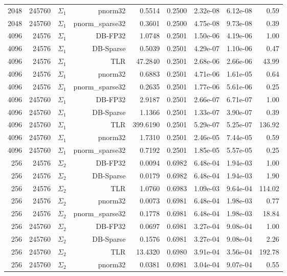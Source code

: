 \begin{tabular}{|r|r|r|r|r|r|r|r|r|}
  2048 & 245760 & $\Sigma_1$ & pnorm32 & 0.5514 & 0.2500 & 2.32e-08 & 6.12e-08 & 0.59 \\
  2048 & 245760 & $\Sigma_1$ & pnorm\_sparse32 & 0.3601 & 0.2500 & 4.75e-08 & 9.73e-08 & 0.39 \\
  4096 & 24576 & $\Sigma_1$ & DB-FP32 & 1.0748 & 0.2501 & 1.50e-06 & 4.19e-06 & 1.00 \\
  4096 & 24576 & $\Sigma_1$ & DB-Sparse & 0.5039 & 0.2501 & 4.29e-07 & 1.10e-06 & 0.47 \\
  4096 & 24576 & $\Sigma_1$ & TLR & 47.2840 & 0.2501 & 2.68e-06 & 2.66e-06 & 43.99 \\
  4096 & 24576 & $\Sigma_1$ & pnorm32 & 0.6883 & 0.2501 & 4.71e-06 & 1.61e-05 & 0.64 \\
  4096 & 24576 & $\Sigma_1$ & pnorm\_sparse32 & 0.2635 & 0.2501 & 1.77e-06 & 5.61e-06 & 0.25 \\
  4096 & 245760 & $\Sigma_1$ & DB-FP32 & 2.9187 & 0.2501 & 2.66e-07 & 6.71e-07 & 1.00 \\
  4096 & 245760 & $\Sigma_1$ & DB-Sparse & 1.1366 & 0.2501 & 1.33e-07 & 3.90e-07 & 0.39 \\
  4096 & 245760 & $\Sigma_1$ & TLR & 399.6190 & 0.2501 & 5.29e-07 & 5.25e-07 & 136.92 \\
  4096 & 245760 & $\Sigma_1$ & pnorm32 & 1.7310 & 0.2501 & 2.46e-05 & 7.44e-05 & 0.59 \\
  4096 & 245760 & $\Sigma_1$ & pnorm\_sparse32 & 0.7192 & 0.2501 & 1.85e-05 & 5.57e-05 & 0.25 \\
  256 & 24576 & $\Sigma_2$ & DB-FP32 & 0.0094 & 0.6982 & 6.48e-04 & 1.94e-03 & 1.00 \\
  256 & 24576 & $\Sigma_2$ & DB-Sparse & 0.0179 & 0.6982 & 6.48e-04 & 1.94e-03 & 1.90 \\
  256 & 24576 & $\Sigma_2$ & TLR & 1.0760 & 0.6983 & 1.09e-03 & 9.64e-04 & 114.02 \\
  256 & 24576 & $\Sigma_2$ & pnorm32 & 0.0073 & 0.6981 & 6.48e-04 & 1.98e-03 & 0.77 \\
  256 & 24576 & $\Sigma_2$ & pnorm\_sparse32 & 0.1778 & 0.6981 & 6.48e-04 & 1.98e-03 & 18.84 \\
  256 & 245760 & $\Sigma_2$ & DB-FP32 & 0.0697 & 0.6981 & 3.27e-04 & 9.08e-04 & 1.00 \\
  256 & 245760 & $\Sigma_2$ & DB-Sparse & 0.1576 & 0.6981 & 3.27e-04 & 9.08e-04 & 2.26 \\
  256 & 245760 & $\Sigma_2$ & TLR & 13.4320 & 0.6980 & 3.91e-04 & 3.56e-04 & 192.78 \\
  256 & 245760 & $\Sigma_2$ & pnorm32 & 0.0381 & 0.6981 & 3.04e-04 & 9.07e-04 & 0.55 \\

\end{tabular}
